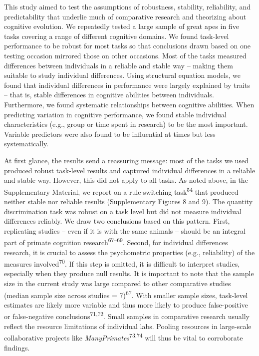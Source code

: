 \documentclass[
  man,floatsintext]{apa6}
\begin{document}
This study aimed to test the assumptions of robustness, stability, reliability, and predictability that underlie much of comparative research and theorizing about cognitive evolution. We repeatedly tested a large sample of great apes in five tasks covering a range of different cognitive domains. We found task-level performance to be robust for most tasks so that conclusions drawn based on one testing occasion mirrored those on other occasions. Most of the tasks measured differences between individuals in a reliable and stable way -- making them suitable to study individual differences. Using structural equation models, we found that individual differences in performance were largely explained by traits -- that is, stable differences in cognitive abilities between individuals. Furthermore, we found systematic relationships between cognitive abilities. When predicting variation in cognitive performance, we found stable individual characteristics (e.g., group or time spent in research) to be the most important. Variable predictors were also found to be influential at times but less systematically.

At first glance, the results send a reassuring message: most of the tasks we used produced robust task-level results and captured individual differences in a reliable and stable way. However, this did not apply to all tasks. As noted above, in the Supplementary Material, we report on a rule-switching task\textsuperscript{54} that produced neither stable nor reliable results (Supplementary Figures 8 and 9). The quantity discrimination task was robust on a task level but did not measure individual differences reliably. We draw two conclusions based on this pattern. First, replicating studies -- even if it is with the same animals -- should be an integral part of primate cognition research\textsuperscript{67--69}. Second, for individual differences research, it is crucial to assess the psychometric properties (e.g., reliability) of the measures involved\textsuperscript{70}. If this step is omitted, it is difficult to interpret studies, especially when they produce null results. It is important to note that the sample size in the current study was large compared to other comparative studies (median sample size across studies = 7)\textsuperscript{67}. With smaller sample sizes, task-level estimates are likely more variable and thus more likely to produce false-positive or false-negative conclusions\textsuperscript{71,72}. Small samples in comparative research usually reflect the resource limitations of individual labs. Pooling resources in large-scale collaborative projects like \emph{ManyPrimates}\textsuperscript{73,74} will thus be vital to corroborate findings.
\end{document}
